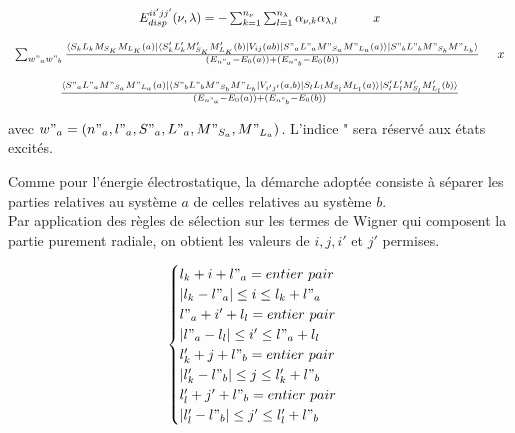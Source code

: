 \begin{equation}
   \begin{array}{c}
   E_{disp}^{ii'jj'} (\nu , \lambda) = - \sum_{k=1}^{n_{\nu}} \sum_{l=1}^{n_{\lambda}} \alpha_{\nu , k} \alpha_{\lambda , l} \hspace{1cm} x \\
   	\\
   \sum_{w"_{a} w"_{b}} \frac{\langle S_{k} L_{k} M_{S_{K}} M_{L_{K}} (a) |\langle S'_{k} L'_{k} M'_{S_{K}} M'_{L_{K}} (b)| V_{ij} (ab) | S"_{a} L"_{a} M"_{S_{a}} M"_{L_{a}} (a)\rangle| S"_{b} L"_{b} M"_{S_{b}} M"_{L_{b}} \rangle}{(E_{n"_{a}} - E_{0}(a)) + (E_{n"_{b}} - E_{0}(b))} \hspace{0.5 cm} x \\
   	\\
   \frac{\langle S"_{a} L"_{a} M"_{S_{a}} M"_{L_{a}} (a)| \langle S"_{b} L"_{b} M"_{S_{b}} M"_{L_{b}} | V_{i'j'}(a,b)| S_{l} L_{l} M_{S_{l}} M_{L_{l}} (a) \rangle | S'_{l} L'_{l} M'_{S_{l}} M'_{L_{l}} (b) \rangle}{(E_{n"_{a}} - E_{0} (a)) + (E_{n"_{b}} - E_{0}(b))}
   \end{array}
\end{equation}
		
avec $w"_{a} = (n"_{a}, l"_{a}, S"_{a}, L"_{a}, M"_{S_{a}}, M"_{L_{a}})$. L'indice " sera réservé aux états excités. 
	
Comme pour l'énergie électrostatique, la démarche adoptée consiste à séparer les parties relatives au système $a$ de celles relatives au système $b$. \\

Par application des règles de sélection sur les termes de Wigner qui composent la partie purement radiale, on obtient les valeurs de $i, j, i'$ et $j'$ permises. 
	
	\begin{equation}
	\begin{cases}
	l_{k} + i + l"_{a} = entier\ pair \\
	|l_{k} - l"_{a}| \leq i \leq l_{k} + l"_{a} \\
	l"_{a} + i' + l_{l} = entier\ pair \\
	|l"_{a} - l_{l}| \leq i' \leq l"_{a} + l_{l} \\
	l'_{k} + j + l"_{b} = entier\ pair \\
	|l'_{k} - l"_{b}| \leq j \leq l'_{k} + l"_{b} \\
	l'_{l} + j' + l"_{b} = entier\ pair \\
	|l'_{l} - l"_{b}| \leq j' \leq l'_{l} + l"_{b}
	\end{cases}
	\end{equation}

